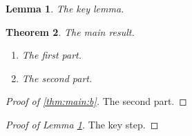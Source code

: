 \documentclass{article}
\newtheorem{theorem}{Theorem}
\newtheorem{lemma}[theorem]{Lemma}
\begin{document}
\begin{lemma}\label{lem:key}
The key lemma.
\end{lemma}
\begin{theorem}\label{thm:main}
The main result.
\begin{enumerate}
\item[(a)] The first part.\label{thm:main:a}
\item[(b)] The second part.\label{thm:main:b}
\end{enumerate}
\end{theorem}
\begin{proof}[Proof of \ref{thm:main:b}]
The second part.
\end{proof}
\begin{proof}[Proof of Lemma \ref{lem:key}]
The key step.
\end{proof}
\end{document}
